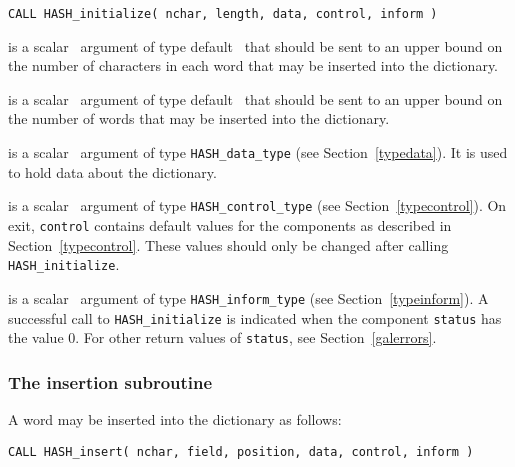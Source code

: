 \documentclass{galahad}
\newcommand{\packagename}{HASH}
\begin{document}
\hspace{8mm}
{\tt CALL \packagename\_initialize( nchar, length, data, control, inform )}

\vspace*{-2mm}
\begin{description}

 is a scalar \intentin\ argument of type default \integer\ that
should be sent to an upper bound on the number of characters in each
word that may be inserted into the dictionary.

 is a scalar \intentin\ argument of type default \integer\ that
should be sent to an upper bound on the number of words that
may be inserted into the dictionary.

 is a scalar \intentinout\ argument of type
{\tt \packagename\_data\_type}
(see Section~\ref{typedata}). It is used to hold data about the dictionary.

 is a scalar \intentout\ argument of type
{\tt \packagename\_control\_type}
(see Section~\ref{typecontrol}).
On exit, {\tt control} contains default values for the components as
described in Section~\ref{typecontrol}.
These values should only be changed after calling
{\tt \packagename\_initialize}.

 is a scalar \intentout\ argument of type
{\tt \packagename\_inform\_type}
(see Section~\ref{typeinform}). A successful call to
{\tt \packagename\_initialize}
is indicated when the  component {\tt status} has the value 0.
For other return values of {\tt status}, see Section~\ref{galerrors}.

\end{description}


\subsubsection{The insertion subroutine}\label{subinsert}
A word may be inserted into the dictionary as follows:
\vspace*{1mm}

\hspace{8mm}
{\tt CALL \packagename\_insert( nchar, field, position, data, control, inform )}
\end{document}
